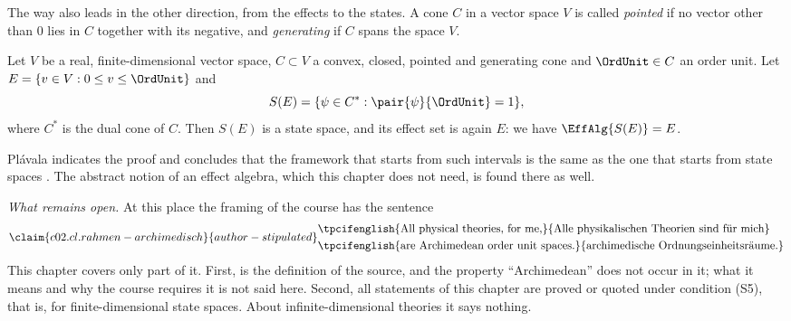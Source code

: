 \begin{fundament}
  The way also leads in the other direction, from the effects to the states. A cone $C$ in
  a vector space $V$ is called \emph{pointed} if no vector other than $0$ lies in $C$
  together with its negative, and \emph{generating} if $C$ spans the space $V$.

  \begin{proposition}\label{c02.prop.rueckweg}
    Let $V$ be a real, finite-dimensional vector space, $C \subset V$ a convex, closed,
    pointed and generating cone and $\OrdUnit \in C$ an order unit. Let
    $E = \{ v \in V : 0 \leq v \leq \OrdUnit \}$ and
    \begin{equation}\label{c02.eq.rueckweg}
      S(E) = \{ \psi \in C^{*} : \pair{\psi}{\OrdUnit} = 1 \} ,
    \end{equation}
    where $C^{*}$ is the dual cone of $C$. Then $S(E)$ is a state space, and its effect set
    is again $E$: we have $\EffAlg{S(E)} = E$.
  \end{proposition}

  Plávala indicates the proof and concludes that the framework that starts from such
  intervals is the same as the one that starts from state spaces
  .
  The abstract notion of an effect algebra, which this chapter does not need, is found
  there as well.

  \emph{What remains open.} At this place the framing of the course has the sentence
  \begin{equation}\label{c02.eq.rahmen-archimedisch}\claim{c02.cl.rahmen-archimedisch}{author-stipulated}
    \begin{aligned}
      &\text{\tpcifenglish{All physical theories, for me,}{Alle physikalischen Theorien sind für mich}} \\
      &\text{\tpcifenglish{are Archimedean order unit spaces.}{archimedische Ordnungseinheitsräume.}}
    \end{aligned}
  \end{equation}
  This chapter covers only part of it. First,  is the definition of the source,
  and the property “Archimedean” does not occur in it; what it means and why the course
  requires it is not said here. Second, all statements of this chapter are proved or
  quoted under condition (S5), that is, for finite-dimensional state spaces. About
  infinite-dimensional theories it says nothing.
\end{fundament}
